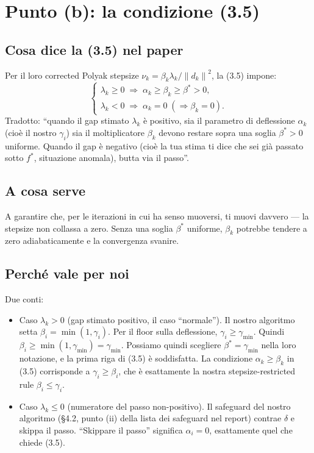\documentclass[11pt,a4paper]{article}
\newcommand{\norm}[1]{\left\|#1\right\|}
\theoremstyle{definition}
\begin{document}
\section{Punto (b): la condizione (3.5)}

\subsection*{Cosa dice la (3.5) nel paper}

Per il loro corrected Polyak stepsize $\nu_k = \beta_k \lambda_k / \norm{d_k}^2$, la (3.5) impone:
\[
\begin{cases}
\lambda_k \ge 0 \;\Rightarrow\; \alpha_k \ge \beta_k \ge \beta^* > 0, \\
\lambda_k < 0 \;\Rightarrow\; \alpha_k = 0 \;(\Rightarrow \beta_k = 0).
\end{cases}
\]
Tradotto: ``quando il gap stimato $\lambda_k$ è positivo, sia il parametro di deflessione $\alpha_k$ (cioè il nostro $\gamma_i$) sia il moltiplicatore $\beta_k$ devono restare sopra una soglia $\beta^* > 0$ uniforme. Quando il gap è negativo (cioè la tua stima ti dice che sei già passato sotto $f^*$, situazione anomala), butta via il passo''.

\subsection*{A cosa serve}

A garantire che, per le iterazioni in cui ha senso muoversi, ti muovi davvero --- la stepsize non collassa a zero. Senza una soglia $\beta^*$ uniforme, $\beta_k$ potrebbe tendere a zero adiabaticamente e la convergenza svanire.

\subsection*{Perché vale per noi}

Due conti:
\begin{itemize}[leftmargin=*]
\item Caso $\lambda_k > 0$ (gap stimato positivo, il caso ``normale''). Il nostro algoritmo setta $\beta_i = \min(1, \gamma_i)$. Per il floor sulla deflessione, $\gamma_i \ge \gamma_{\min}$. Quindi $\beta_i \ge \min(1, \gamma_{\min}) = \gamma_{\min}$. Possiamo quindi scegliere $\beta^* = \gamma_{\min}$ nella loro notazione, e la prima riga di (3.5) è soddisfatta. La condizione $\alpha_k \ge \beta_k$ in (3.5) corrisponde a $\gamma_i \ge \beta_i$, che è esattamente la nostra stepsize-restricted rule $\beta_i \le \gamma_i$.

\item Caso $\lambda_k \le 0$ (numeratore del passo non-positivo). Il safeguard del nostro algoritmo (\S4.2, punto (ii) della lista dei safeguard nel report) contrae $\delta$ e skippa il passo. ``Skippare il passo'' significa $\alpha_i = 0$, esattamente quel che chiede (3.5).
\end{itemize}
\end{document}
